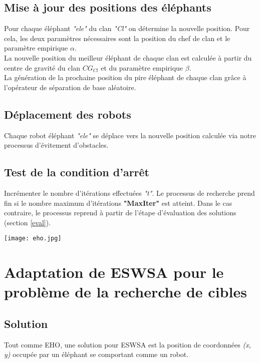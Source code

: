 \subsection{Mise à jour des positions des éléphants}
Pour chaque éléphant \textit{"ele"} du clan \textit{"Cl"} on détermine la nouvelle position. Pour cela, les deux paramètres nécessaires sont la position du chef de clan et le paramètre empirique $\alpha$.\\

La nouvelle position du meilleur éléphant de chaque clan est calculée à partir du centre de gravité du clan $CG_{Cl}$ et du paramètre empirique $\beta$.\\

La génération de la prochaine position du pire éléphant de chaque clan grâce à l'opérateur de séparation de base aléatoire.

\subsection{Déplacement des robots}
Chaque robot éléphant \textit{"ele"} se déplace vers la nouvelle position calculée via notre processus d'évitement d'obstacles.


\subsection{Test de la condition d'arrêt}
Incrémenter le nombre d'itérations effectuées \textit{"t"}.
Le processus de recherche prend fin si le nombre maximum d’itérations \textbf{"MaxIter"} est atteint. Dans le cas contraire, le processus reprend à partir de l'étape d'évaluation des solutions (section \ref{eval}). 
	


\noindent

\begin{center}	  
	\captionsetup{width=1\linewidth}
	\texttt{[image: eho.jpg]}%
	\vspace{-0.1 cm}
	\label{eho}%
\end{center}



\newpage

\section{Adaptation de ESWSA pour le problème de la recherche de cibles}
\subsection{Solution}
Tout comme EHO, une solution pour ESWSA est la position de coordonnées \textit{(x, y)} occupée par un éléphant se comportant comme un robot.

